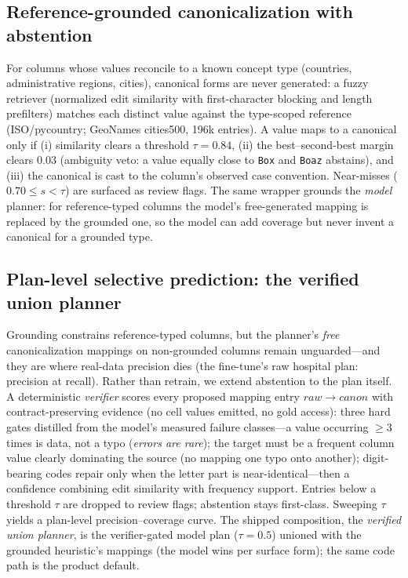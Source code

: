 \documentclass[11pt]{article}
\begin{document}
\subsection{Reference-grounded canonicalization with abstention}
\label{sec:grounding}
For columns whose values reconcile to a known concept type (countries, administrative
regions, cities), canonical forms are never generated: a fuzzy retriever (normalized
edit similarity with first-character blocking and length prefilters) matches each
distinct value against the type-scoped reference (ISO/pycountry; GeoNames cities500,
196k entries). A value maps to a canonical only if (i) similarity clears a threshold
$\tau{=}0.84$, (ii) the best--second-best margin clears $0.03$ (ambiguity veto: a value
equally close to \texttt{Box} and \texttt{Boaz} abstains), and (iii) the canonical is
cast to the column's observed case convention. Near-misses ($0.70{\le}s{<}\tau$) are
surfaced as review flags. The same wrapper grounds the \emph{model} planner: for
reference-typed columns the model's free-generated mapping is replaced by the grounded
one, so the model can add coverage but never invent a canonical for a grounded type.

\subsection{Plan-level selective prediction: the verified union planner}
\label{sec:verifier}
Grounding constrains reference-typed columns, but the planner's \emph{free}
canonicalization mappings on non-grounded columns remain unguarded---and they are where
real-data precision dies (the fine-tune's raw hospital plan: \hospModelPrecVSix{}
precision at \hospModelRecallVSix{} recall). Rather than retrain, we extend abstention
to the plan itself. A deterministic \emph{verifier} scores every proposed mapping entry
$raw{\to}canon$ with contract-preserving evidence (no cell values emitted, no gold
access): three hard gates distilled from the model's measured failure classes---a value
occurring ${\ge}3$ times is data, not a typo (\emph{errors are rare}); the target must
be a frequent column value clearly dominating the source (no mapping one typo onto
another); digit-bearing codes repair only when the letter part is near-identical---then
a confidence combining edit similarity with frequency support. Entries below a
threshold $\tau$ are dropped to review flags; abstention stays first-class. Sweeping
$\tau$ yields a plan-level precision--coverage curve. The shipped composition,
the \emph{verified union planner}, is the verifier-gated model plan ($\tau{=}0.5$)
unioned with the grounded heuristic's mappings (the model wins per surface form);
the same code path is the product default.
\end{document}
